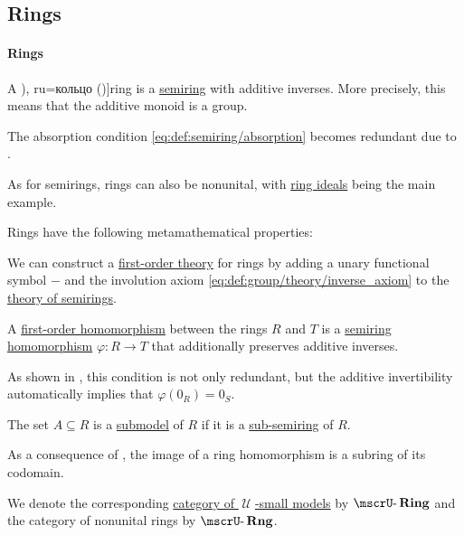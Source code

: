 \subsection{Rings}\label{subsec:rings}

\paragraph{Rings}

\begin{definition}\label{def:ring}\cite[141]{Knapp2016BasicAlgebra}
  A \term[bg=пръстен (\cite[def. V.1]{ГеновМиховскиМоллов1991}), ru=кольцо (\cite[def. 1.3.1]{Винберг2014})]{ring} is a \hyperref[def:semiring]{semiring} with additive inverses. More precisely, this means that the additive monoid is a group.

  The absorption condition \eqref{eq:def:semiring/absorption} becomes redundant due to .

  As for semirings, rings can also be nonunital, with \hyperref[def:semiring_ideal]{ring ideals} being the main example.

  Rings have the following metamathematical properties:
  \begin{thmenum}
     We can construct a \hyperref[def:first_order_theory]{first-order theory} for rings by adding a unary functional symbol \( - \) and the involution axiom \eqref{eq:def:group/theory/inverse_axiom} to the \hyperref[def:semiring/theory]{theory of semirings}.

     A \hyperref[def:first_order_homomorphism]{first-order homomorphism} between the rings \( R \) and \( T \) is a \hyperref[def:semiring/homomorphism]{semiring homomorphism} \( \varphi: R \to T \) that additionally preserves additive inverses.

    As shown in , this condition is not only redundant, but the additive invertibility automatically implies that \( \varphi(0_R) = 0_S \).

     The set \( A \subseteq R \) is a \hyperref[def:first_order_submodel]{submodel} of \( R \) if it is a \hyperref[def:semiring]{sub-semiring} of \( R \).

    As a consequence of , the image of a ring homomorphism is a subring of its codomain.

     We denote the corresponding \hyperref[def:category_of_small_first_order_models]{category of \( \mscrU \)-small models} by \( \ucat{Ring} \) and the category of nonunital rings by \( \ucat{Rng} \).


\end{thmenum}
\end{definition}
